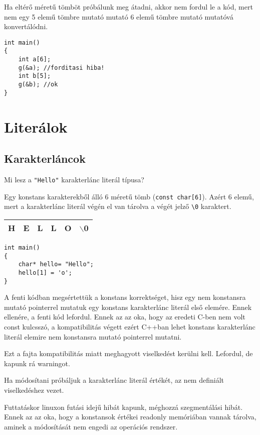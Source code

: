 \documentclass[a4paper,11.5pt,table]{article}
\begin{document}
	Ha eltérő méretű tömböt próbálunk meg átadni, akkor nem fordul le a kód, mert nem egy 5 elemű tömbre mutató mutató 6 elemű tömbre mutató mutatóvá konvertálódni.
	\begin{lstlisting}
int main()
{
	int a[6];
	g(&a); //forditasi hiba!
	int b[5];
	g(&b); //ok
}
	\end{lstlisting}
	
	\section{Literálok}
	\subsection{Karakterláncok}
	Mi lesz a \texttt{"Hello"} karakterlánc literál típusa?
	\smallskip
	
	Egy konstans karakterekből álló 6 méretű tömb (\texttt{const char[6]}). Azért 6 elemű, mert a karakterlánc literál végén el van tárolva a végét jelző \texttt{\textbackslash 0} karaktert.
	
	\begin{center}
		\setlength{\extrarowheight}{2pt}
		\begin{tabular}{|c|c|c|c|c|c|}
			\hline
			H&E&L&L&O&$\backslash$0\\
			\hline
		\end{tabular}
	\end{center}
	\begin{lstlisting}
int main()
{
	char* hello= "Hello";
	hello[1] = 'o';
}
	\end{lstlisting}
	A fenti kódban megsértettük a konstans korrektséget, hisz egy nem konstansra mutató pointerrel mutatuk egy konstans karakterlánc literál első elemére. Ennek ellenére, a fenti kód lefordul. Ennek az az oka, hogy az eredeti C-ben nem volt const kulcsszó, a kompatibilitás végett ezért C++ban lehet konstans karakterlánc literál elemire nem konstansra mutató pointerrel mutatni.
	\begin{note}
		Ezt a fajta kompatibilitás miatt meghagyott viselkedést kerülni kell. Lefordul, de kapunk rá warningot.
	\end{note}
	Ha módosítani próbáljuk a karakterlánc literál értékét, az nem definiált viselkedéshez vezet. 
	
	Futtatáskor linuxon futási idejű hibát kapunk, méghozzá szegmentálási hibát. Ennek az az oka, hogy a konstansok értékei readonly memóriában vannak tárolva, aminek a módosítását nem engedi az operációs rendszer.
  \medskip
	
\end{document}
